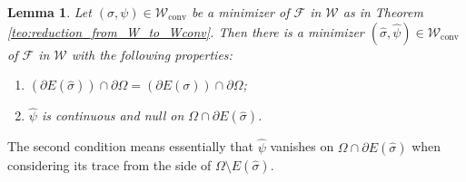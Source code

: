 \documentclass[JEP,XML,SOM,Unicode, NoFloatCountersInSection,published]{cedram}
\let\Om\Omega
\newcommand\admclassconv{{\mathcal W_\mathrm{conv}}}
\newtheorem{lemma}[theorem]{Lemma}
\theoremstyle{definition}
\begin{document}
\begin{lemma}\label{lem:continuita-bordo-E}
Let $(\sigma,\psi)\in \admclassconv$ be a minimizer of $\mathcal F$ in $\mathcal W$ as in
Theorem \ref{teo:reduction_from_W_to_Wconv}.
Then there is a minimizer $(\widehat\sigma,\widehat\psi)\in \admclassconv$ of $\mathcal F$ in $\mathcal W$
with the following properties:
\begin{enumerate}[{\rm (1)},wide]
\item\label{lem1.}$(\partial E(\widehat\sigma))\cap\partial\Om=(\partial E(\sigma))\cap\partial\Om$;
\item\label{lem2.} $\widehat\psi$ is continuous and null
on $\Om\cap\partial E(\widehat\sigma)$.
\end{enumerate}
\end{lemma}
The second condition means essentially that $\widehat\psi$ vanishes on $\Om\cap\partial E(\widehat\sigma)$ when considering its trace from the side of $\Om\setminus E(\widehat\sigma)$.
\end{document}
